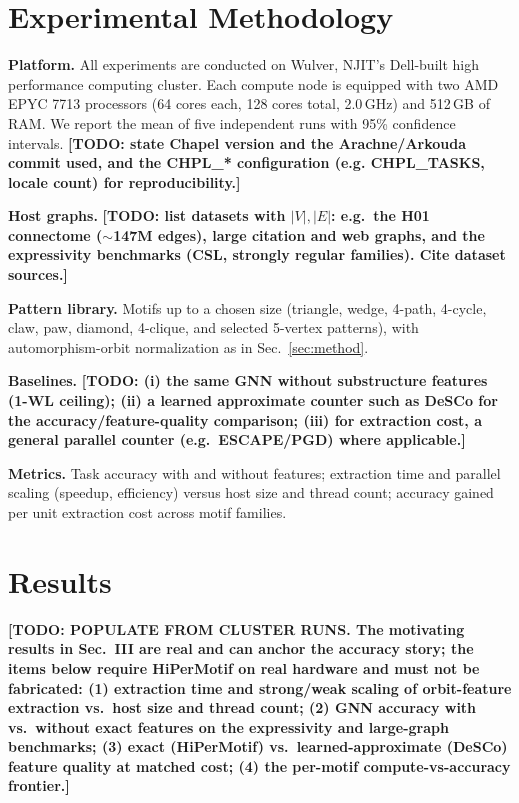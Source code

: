 \documentclass[conference]{IEEEtran}
\newcommand{\todo}[1]{{\color{red}\textbf{[TODO: #1]}}}
\begin{document}
\section{Experimental Methodology}\label{sec:method-exp}
\textbf{Platform.} All experiments are conducted on Wulver, NJIT's
Dell-built high performance computing cluster. Each compute node is equipped with
two AMD EPYC 7713 processors (64 cores each, 128 cores total, 2.0\,GHz) and
512\,GB of RAM. We report the mean of five independent runs with 95\% confidence
intervals. \todo{state Chapel version and the Arachne/Arkouda commit used, and the
CHPL\_* configuration (e.g. CHPL\_TASKS, locale count) for reproducibility.}

\textbf{Host graphs.} \todo{list datasets with $|V|,|E|$: e.g.\ the H01 connectome
($\sim$147M edges), large citation and web graphs, and the expressivity benchmarks
(CSL, strongly regular families). Cite dataset sources.}

\textbf{Pattern library.} Motifs up to a chosen size (triangle, wedge, 4-path,
4-cycle, claw, paw, diamond, 4-clique, and selected 5-vertex patterns), with
automorphism-orbit normalization as in Sec.~\ref{sec:method}.

\textbf{Baselines.} \todo{(i) the same GNN without substructure features (1-WL
ceiling); (ii) a learned approximate counter such as DeSCo for the
accuracy/feature-quality comparison; (iii) for extraction cost, a general parallel
counter (e.g.\ ESCAPE/PGD) where applicable.}

\textbf{Metrics.} Task accuracy with and without features; extraction time and
parallel scaling (speedup, efficiency) versus host size and thread count;
accuracy gained per unit extraction cost across motif families.

\section{Results}\label{sec:results}
\todo{POPULATE FROM CLUSTER RUNS. The motivating results in Sec.~III are real and
can anchor the accuracy story; the items below require HiPerMotif on real hardware
and must not be fabricated:
(1) extraction time and strong/weak scaling of orbit-feature extraction vs.\ host
size and thread count;
(2) GNN accuracy with vs.\ without exact features on the expressivity and
large-graph benchmarks;
(3) exact (HiPerMotif) vs.\ learned-approximate (DeSCo) feature quality at matched
cost;
(4) the per-motif compute-vs-accuracy frontier.}
\end{document}
